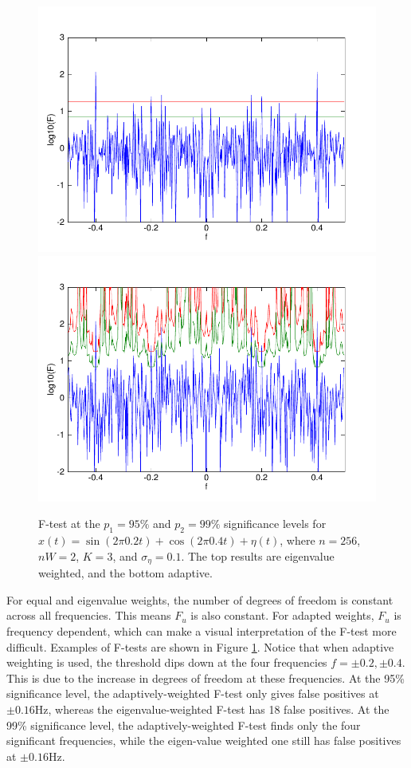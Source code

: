 \begin{figure}
    \centering
    \includegraphics[width=4.75in]{pics/Fstat1_256.pdf}\\ \includegraphics[width=4.75in]{pics/Fstat2_256.pdf}\\
    \caption[F-test example]{F-test at the \textcolor{green!40!black}{$p_1=95\%$} and \textcolor{red!80!black}{$p_2=99\%$} significance levels for $x(t)=\sin(2\pi0.2t)+\cos(2\pi0.4t) + \eta(t)$, where $n=256$, $nW=2$, $K=3$, and $\sigma_\eta=0.1$. The top results are eigenvalue weighted, and the bottom adaptive.\label{fig:f_stat}}
\end{figure}

For equal and eigenvalue weights, the number of degrees of freedom is constant across all frequencies.  This means $F_u$ is also constant.  For adapted weights, $F_u$ is frequency dependent, which can make a visual interpretation of the F-test more difficult.  Examples of F-tests are shown in Figure \ref{fig:f_stat}.  Notice that when adaptive weighting is used, the threshold dips down at the four frequencies $f=\pm 0.2, \pm0.4$.  This is due to the increase in degrees of freedom at these frequencies.  At the 95\%  significance level, the adaptively-weighted F-test only gives false positives at $\pm 0.16$Hz, whereas the eigenvalue-weighted F-test has 18 false positives.  At the 99\% significance level, the adaptively-weighted F-test finds only the four significant frequencies, while the eigen-value weighted one still has false positives at $\pm 0.16$Hz.

